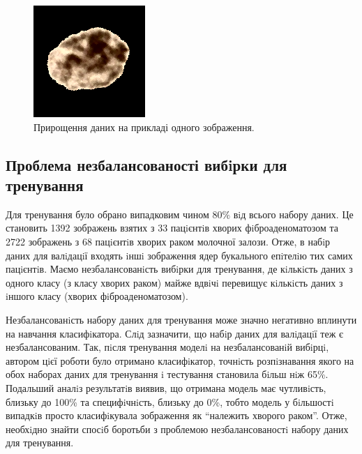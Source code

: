 \begin{figure}[t!]
	\endminipage\hfill
	\centering	
	\includegraphics[width=0.97\linewidth]{Figures/Chapter4/aug_4.png}
	\endminipage\hfill	
	
	\caption{Прирощення даних на прикладі одного зображення.}
	\label{fig:data_augmentation}
\end{figure}


\subsection{Проблема незбалансованості вибiрки для тренування}

Для тренування було обрано випадковим чином \(80\%\) вiд всього набору даних. Це становить 1392 зображень взятих з 33 пацiєнтiв хворих фiброаденоматозом та 2722 зображень з 68 пацiєнтiв хворих раком молочної залози. Отже, в набiр даних для валiдацiї входять iншi зображення ядер букального епiтелiю тих самих пацiєнтiв. Маємо незбалансованiсть вибiрки для тренування, де кiлькiсть даних з одного класу (з класу хворих раком) майже вдвiчi перевищує кiлькiсть даних з iншого класу (хворих фiброаденоматозом). 

Незбалансованiсть набору даних для тренування може значно негативно вплинути на навчання класифiкатора. Слiд зазначити, що набiр даних для валiдацiї теж є незбалансованим. Так, пiсля тренування моделi на незбалансованiй вибiрцi, автором цiєї роботи було отримано класифiкатор, точнiсть розпiзнавання якого на обох наборах даних для тренування i тестування становила бiльш нiж 65\%. Подальший аналiз результатiв виявив, що отримана модель має чутливiсть, близьку до 100\% та специфiчнiсть, близьку до 0\%, тобто модель у бiльшостi випадкiв просто класифiкувала зображення як \enquote{належить хворого раком}. Отже, необхiдно знайти спосiб боротьби з проблемою незбалансованостi набору даних для тренування.

